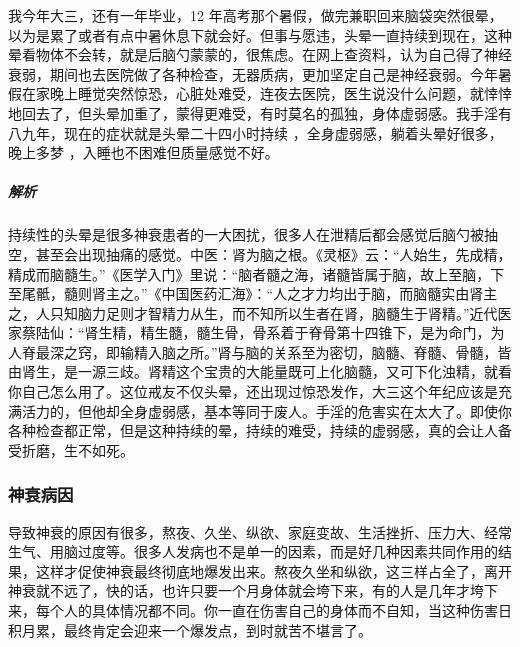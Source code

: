 \begin{case}[神经衰弱]
    我今年大三，还有一年毕业，12 年高考那个暑假，做完兼职回来脑袋突然很晕，以为是累了或者有点中暑休息下就会好。但事与愿违，头晕一直持续到现在，这种晕看物体不会转，就是后脑勺蒙蒙的，很焦虑。在网上查资料，认为自己得了神经衰弱，期间也去医院做了各种检查，无器质病，更加坚定自己是神经衰弱。今年暑假在家晚上睡觉突然惊恐，心脏处难受，连夜去医院，医生说没什么问题，就悻悻地回去了，但头晕加重了，蒙得更难受，有时莫名的孤独，身体虚弱感。我手淫有八九年，现在的症状就是头晕二十四小时持续 ，全身虚弱感，躺着头晕好很多，晚上多梦 ，入睡也不困难但质量感觉不好。
    \subparagraph{解析} 持续性的头晕是很多神衰患者的一大困扰，很多人在泄精后都会感觉后脑勺被抽空，甚至会出现抽痛的感觉。中医：肾为脑之根。《灵枢》云：“人始生，先成精，精成而脑髓生。”《医学入门》里说：“脑者髓之海，诸髓皆属于脑，故上至脑，下至尾骶，髓则肾主之。”《中国医药汇海》：“人之才力均出于脑，而脑髓实由肾主之，人只知脑力足则才智精力从生，而不知所以生者在肾，脑髓生于肾精。”近代医家蔡陆仙：“肾生精，精生髓，髓生骨，骨系着于脊骨第十四锥下，是为命门，为人脊最深之窍，即输精入脑之所。”肾与脑的关系至为密切，脑髓、脊髓、骨髓，皆由肾生，是一源三歧。肾精这个宝贵的大能量既可上化脑髓，又可下化浊精，就看你自己怎么用了。这位戒友不仅头晕，还出现过惊恐发作，大三这个年纪应该是充满活力的，但他却全身虚弱感，基本等同于废人。手淫的危害实在太大了。即使你各种检查都正常，但是这种持续的晕，持续的难受，持续的虚弱感，真的会让人备受折磨，生不如死。
\end{case}

\subsubsection{神衰病因}

导致神衰的原因有很多，熬夜、久坐、纵欲、家庭变故、生活挫折、压力大、经常生气、用脑过度等。很多人发病也不是单一的因素，而是好几种因素共同作用的结果，这样才促使神衰最终彻底地爆发出来。熬夜久坐和纵欲，这三样占全了，离开神衰就不远了，快的话，也许只要一个月身体就会垮下来，有的人是几年才垮下来，每个人的具体情况都不同。你一直在伤害自己的身体而不自知，当这种伤害日积月累，最终肯定会迎来一个爆发点，到时就苦不堪言了。

